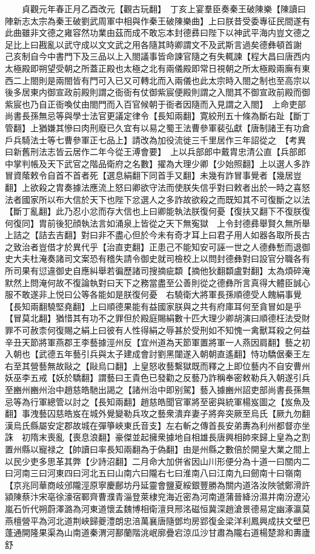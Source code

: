 　　貞觀元年春正月乙酉改元【觀古玩翻】　丁亥上宴羣臣奏秦王破陳樂【陳讀曰陣新志太宗為秦王破劉武周軍中相與作秦王破陳樂曲】上曰朕昔受委專征民間遂有此曲雖非文德之雍容然功業由茲而成不敢忘本封德彞曰陛下以神武平海内豈文德之足比上曰戡亂以武守成以文文武之用各隨其時卿謂文不及武斯言過矣德彝頓首謝　己亥制自今中書門下及三品以上入閤議事皆命諫官隨之有失輒諫【程大昌曰唐西内太極殿即朔望受朝之所蓋正殿也太極之北有兩儀殿即常日視朝之所太極殿兩廡有東西二上閤則是兩閤皆有門可入已又可轉北而入兩儀也此太宗時入閤之制也至高宗以後多居東内御宣政前殿則謂之衙衙有仗御紫宸便殿則謂之入閤其不御宣政前殿而御紫宸也乃自正衙喚仗由閤門而入百官候朝于衙者因隨而入見謂之入閤】　上命吏部尚書長孫無忌等與學士法官更議定律令【長知兩翻】寛絞刑五十條為斷右趾【斷丁管翻】上猶嫌其慘曰肉刑廢已久宜有以易之蜀王法曹參軍裴弘獻【唐制諸王有功倉戶兵騎法士等七曹參軍正七品上】請改為加役流徙三千里居作三年詔從之　【考異曰新舊刑法志皆云居作二年今從王溥會要】　上以兵部郎中戴胄忠清公直【兵部郎中掌判帳及天下武官之階品衛府之名數】擢為大理少卿【少始照翻】上以選人多詐冒資䕃敕令自首不首者死【選息絹翻下同首手又翻】未幾有詐冒事覺者【幾居豈翻】上欲殺之胄奏據法應流上怒曰卿欲守法而使朕失信乎對曰敕者出於一時之喜怒法者國家所以布大信於天下也陛下忿選人之多詐故欲殺之而既知其不可復斷之以法【斷丁亂翻】此乃忍小忿而存大信也上曰卿能執法朕復何憂【復扶又翻下不復朕復何復同】胄前後犯顔執法言如涌泉上皆從之天下無寃獄　上令封德彞舉賢久無所舉上詰之【詰去吉翻】對曰非不盡心但於今未有奇才耳上曰君子用人如器各取所長古之致治者豈借才於異代乎【治直吏翻】正患己不能知安可誣一世之人德彝慙而退御史大夫杜淹奏諸司文案恐有稽失請令御史就司檢校上以問封德彝對曰設官分職各有所司果有愆違御史自應糾舉若徧歷諸司搜摘疵纇【摘他狄翻纇盧對翻】太為煩碎淹默然上問淹何故不復論執對曰天下之務當盡至公善則從之德彝所言真得大體臣誠心服不敢遂非上悦曰公等各能如是朕復何憂　右驍衛大將軍長孫順德受人餽絹事覺【長知兩翻驍堅堯翻】上曰順德果能有益國家朕與之共有府庫耳何至貪冒如是乎【冒莫北翻】猶惜其有功不之罪但於殿庭賜絹數十匹大理少卿胡演曰順德枉法受財罪不可赦柰何復賜之絹上曰彼有人性得絹之辱甚於受刑如不知愧一禽獸耳殺之何益　辛丑天節將軍燕郡王李藝據涇州反【宜州道為天節軍置將軍一人燕因肩翻】藝之初入朝也【武德五年藝引兵與太子建成會討劉黑闥遂入朝朝直遙翻】恃功驕倨秦王左右至其營藝無故敺之【敺烏口翻】上皇怒收藝繫獄既而釋之上即位藝内不自安曹州妖巫李五戒【妖於驕翻】謂藝曰王貴色已發勸之反藝乃詐稱奉密敕勒兵入朝遂引兵至豳州豳州治中趙慈皓馳出謁之【諸州治中即别駕】藝入據豳州詔吏部尚書長孫無忌等為行軍總管以討之【長知兩翻】趙慈皓聞官軍將至密與統軍楊岌圖之【岌魚及翻】事洩藝囚慈皓岌在城外覺變勒兵攻之藝衆潰弃妻子將奔突厥至烏氏【厥九勿翻漢烏氏縣屬安定郡故城在彈箏峽東氏音支】左右斬之傳首長安弟夀為利州都督亦坐誅　初隋末喪亂【喪息浪翻】豪傑並起擁衆據地自相雄長唐興相帥來歸上皇為之割置州縣以寵禄之【帥讀曰率長知兩翻為于偽翻】由是州縣之數倍於開皇大業之間上以民少吏多思革其弊【少詩沼翻】二月命大加併省因山川形便分為十道一曰關内二曰河南三曰河東四曰河北五曰山南六曰隴右七曰淮南八曰江南九曰劒南十曰嶺南【京兆同華商岐邠隴涇原寧慶鄜坊丹延靈會鹽夏綏銀豐勝為關内道洛汝陜虢鄭滑許潁陳蔡汴宋亳徐濠宿鄆齊曹濮青淄登萊棣兖海近密為河南道蒲晉絳汾濕并南汾遼沁嵐石忻代朔蔚澤潞為河東道懷孟魏博相衛澶貝邢洺磁恒冀深趙滄景德易定幽涿瀛莫燕檀營平為河北道荆峽歸夔澧朗忠涪萬襄唐隨鄧均房郢復金梁洋利鳳興成扶文壁巴蓬通開隆果渠為山南道秦渭河鄯蘭階洮岷廓疊宕涼瓜沙甘肅為隴右道楊楚滁和夀廬舒
